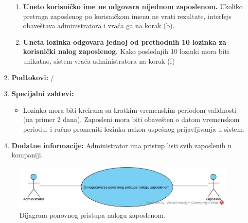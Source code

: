 \documentclass[a4paper]{article}
\begin{document}
\begin{enumerate}
        \begin{enumerate}
            \item \textbf{Uneto korisničko ime ne odgovara nijednom zaposlenom.} Ukoliko pretraga zaposlenog po korisničkom imenu ne vrati rezultate, interfejs obaveštava administratora i vraća ga na korak (b).
            \item \textbf{Uneta lozinka odgovara jednoj od prethodnih 10 lozinka za korisnički nalog zaposlenog.} Kako poslednjih 10 lozinki mora biti unikatno, sistem vraća administratora na korak (f)
        \end{enumerate}
    \item \textbf{Podtokovi:} /
    \item \textbf{Specijalni zahtevi:}
        \begin{itemize}
            \item Lozinka mora biti kreirana sa kratkim vremenskim periodom validnosti (na primer 2 dana). Zaposleni mora biti obavešten o datom vremenskom periodu, i ručno promeniti lozinku nakon uspešnog prijavljivanja u sistem.
        \end{itemize}
    \item \textbf{Dodatne informacije:} Administrator ima pristup listi svih zaposlenih u kompaniji.
\end{enumerate}

\begin{figure} [!ht]
    \begin{center}
        \includegraphics[scale=0.5]{Korisnici/Administrator/UML/SlucajUpotrebe_PonovniPristupNalogu.jpg}
    \end{center}
\caption{Dijagram ponovnog pristupa nalogu zaposlenom.}
\end{figure}
\end{document}
